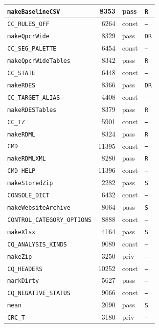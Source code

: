 {\begin{xltabular}{\linewidth}{|l|r|X|X|}
\texttt{makeBaselineCSV} & 8353 & pass & \texttt{R} \\ \hline
\texttt{CC\_RULES\_OFF} & 6264 & const & \texttt{--} \\ \hline
\texttt{makeQpcrWide} & 8329 & pass & \texttt{DR} \\ \hline
\texttt{CC\_SEG\_PALETTE} & 6454 & const & \texttt{--} \\ \hline
\texttt{makeQpcrWideTables} & 8342 & pass & \texttt{R} \\ \hline
\texttt{CC\_STATE} & 6448 & const & \texttt{--} \\ \hline
\texttt{makeRDES} & 8366 & pass & \texttt{DR} \\ \hline
\texttt{CC\_TARGET\_ALIAS} & 4408 & const & \texttt{--} \\ \hline
\texttt{makeRDESTables} & 8379 & pass & \texttt{R} \\ \hline
\texttt{CC\_TZ} & 5901 & const & \texttt{--} \\ \hline
\texttt{makeRDML} & 8324 & pass & \texttt{R} \\ \hline
\texttt{CMD} & 11395 & const & \texttt{--} \\ \hline
\texttt{makeRDMLXML} & 8280 & pass & \texttt{R} \\ \hline
\texttt{CMD\_HELP} & 11396 & const & \texttt{--} \\ \hline
\texttt{makeStoredZip} & 2282 & pass & \texttt{S} \\ \hline
\texttt{CONSOLE\_DICT} & 6432 & const & \texttt{--} \\ \hline
\texttt{makeWebsiteArchive} & 8064 & pass & \texttt{S} \\ \hline
\texttt{CONTROL\_CATEGORY\_OPTIONS} & 8888 & const & \texttt{--} \\ \hline
\texttt{makeXlsx} & 4164 & pass & \texttt{S} \\ \hline
\texttt{CQ\_ANALYSIS\_KINDS} & 9089 & const & \texttt{--} \\ \hline
\texttt{makeZip} & 3250 & priv & \texttt{--} \\ \hline
\texttt{CQ\_HEADERS} & 10252 & const & \texttt{--} \\ \hline
\texttt{markDirty} & 5627 & pass & \texttt{--} \\ \hline
\texttt{CQ\_NEGATIVE\_STATUS} & 9066 & const & \texttt{--} \\ \hline
\texttt{mean} & 2090 & pass & \texttt{S} \\ \hline
\texttt{CRC\_T} & 3180 & priv & \texttt{--} \\ \hline

\end{xltabular}}
